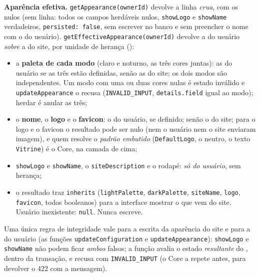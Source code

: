 \textbf{Aparência efetiva.} \texttt{getAppearance(ownerId)} devolve a linha \emph{crua}, com os nulos (sem linha: todos os campos herdáveis nulos, \texttt{showLogo} e \texttt{showName} verdadeiros, \texttt{persisted: false}, sem escrever no banco e sem preencher o nome com o do usuário). \texttt{getEffectiveAppearance(ownerId)} devolve a do usuário \emph{sobre} a do site, por unidade de herança ():
\begin{itemize}
  \item a \textbf{paleta de cada modo} (claro e noturno, as três cores juntas): as do usuário se as três estão definidas, senão as do site; os dois modos são independentes. Um modo com uma ou duas cores nulas é estado inválido e \texttt{updateAppearance} o recusa (\texttt{INVALID\_INPUT}, \texttt{details.field} igual ao modo); herdar é anular as três;
  \item o \textbf{nome}, o \textbf{logo} e o \textbf{favicon}: o do usuário, se definido; senão o do site; para o logo e o favicon o resultado pode ser nulo (nem o usuário nem o site enviaram imagem), e quem resolve o \emph{padrão embutido} (\texttt{DefaultLogo}, o  neutro, o texto \texttt{Vitrine}) é o Core, na camada de cima;
  \item \texttt{showLogo} e \texttt{showName}, o \texttt{siteDescription} e o rodapé: \emph{só do usuário}, sem herança;
  \item o resultado traz \texttt{inherits} (\texttt{lightPalette}, \texttt{darkPalette}, \texttt{siteName}, \texttt{logo}, \texttt{favicon}, todos booleanos) para a interface mostrar o que vem do site. Usuário inexistente: \texttt{null}. Nunca escreve.
\end{itemize}
Uma única regra de integridade vale para a escrita da aparência do site e para a do usuário (as funções \texttt{updateConfiguration} e \texttt{updateAppearance}): \texttt{showLogo} e \texttt{showName} não podem ficar \emph{ambos} falsos; a função avalia o estado \emph{resultante} do , dentro da transação, e recusa com \texttt{INVALID\_INPUT} (o Core a repete antes, para devolver o 422 com a mensagem).

